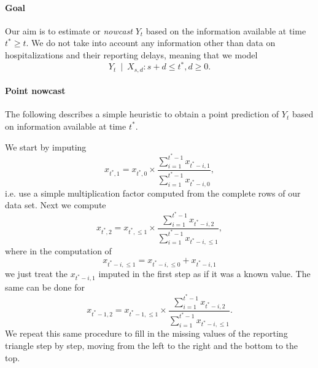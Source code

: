 \documentclass[a4paper, 11pt]{article}\usepackage[]{graphicx}\usepackage[]{color}
\begin{document}
\paragraph{Goal} Our aim is to estimate or \textit{nowcast} $Y_t$ based on the information available at time $t^* \geq t$. We do not take into account any information other than data on hospitalizations and their reporting delays, meaning that we model
$$
Y_t \ \mid \ X_{s, d}: s + d \leq t^*, d \geq 0.
$$

\paragraph{Point nowcast}

The following describes a simple heuristic to obtain a point prediction of $Y_t$ based on information available at time $t^*$. 

We start by imputing
$$
x_{t^*, 1} = x_{t^*, 0} \times \frac{\sum_{i = 1}^{t^* - 1} x_{t^* - i, 1}}{\sum_{i = 1}^{t^* - 1} x_{t^* - i, 0}}, 
$$ 
i.e. use a simple multiplication factor computed from the complete rows of our data set. Next we compute
$$
x_{t^*, 2} = x_{t^*, \leq 1} \times \frac{\sum_{i = 1}^{t^* - 1} x_{t^* - i, 2}}{\sum_{i = 1}^{t^* - 1} x_{t^* - i, \leq 1}},
$$
where in the computation of 
$$
x_{t^* - i, \leq 1} = x_{t^* - i, \leq 0} + x_{t^* - i, 1}
$$
we just treat the $x_{t^* - i, 1}$ imputed in the first step as if it was a known value. The same can be done for
$$
x_{t^* - 1, 2} = x_{t^* - 1, \leq 1} \times \frac{\sum_{i = 1}^{t^* - 1} x_{t^* - i, 2}}{\sum_{i = 1}^{t^* - 1} x_{t^* - i, \leq 1}}.
$$
We repeat this same procedure to fill in the missing values of the reporting triangle step by step, moving from the left to the right and the bottom to the top.
\end{document}
